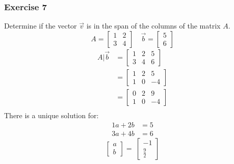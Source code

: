 \documentclass[letterpaper, 12pt]{math}
\begin{document}
\subsubsection*{Exercise 7}
Determine if the vector \( \vec{v} \) is in the span of the columns of the
matrix \( A \).
\[ A = \begin{bmatrix}1 & 2 \\ 3 & 4\end{bmatrix} \quad
  \vec{b} = \begin{bmatrix}5 \\ 6\end{bmatrix} \]
\begin{align*}
  A|\vec{b} &= \begin{bmatrix}
    1 & 2 & 5 \\
    3 & 4 & 6
  \end{bmatrix} \\
  &= \begin{bmatrix}
    1 & 2 & 5 \\
    1 & 0 & -4
  \end{bmatrix} \\
  &= \begin{bmatrix}
    0 & 2 & 9 \\
    1 & 0 & -4
  \end{bmatrix} \\
\end{align*}
There is a unique solution for:
\begin{align*}
  1a+2b &= 5 \\
  3a+4b &= 6
\end{align*}
\[ \begin{bmatrix}a \\ b\end{bmatrix} =\
  \begin{bmatrix}-1 \\ \frac{9}{2}\end{bmatrix} \]
\end{document}
